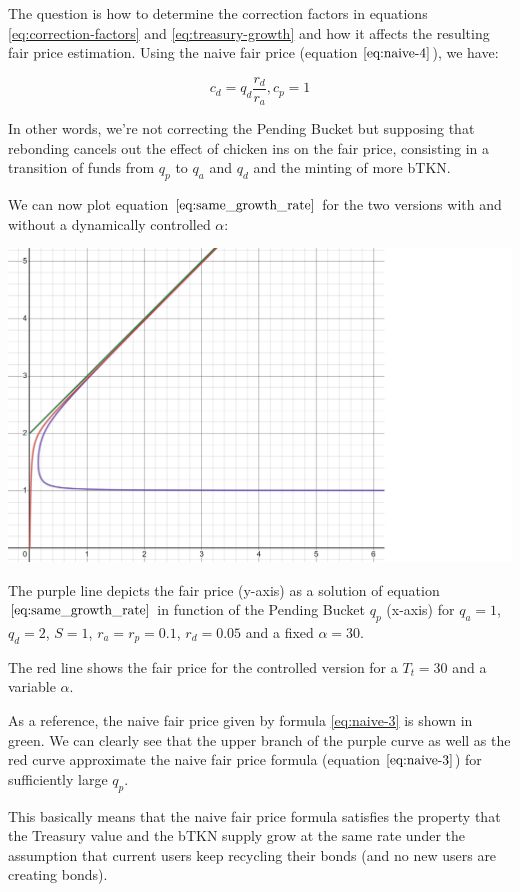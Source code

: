\documentclass{article}
\begin{document}
The question is how to determine the correction factors in equations \ref{eq:correction-factors} and \ref{eq:treasury-growth} and how it affects the resulting fair price estimation. Using the naive fair price (equation $\ref{eq:naive-4}$), we have:

\begin{equation}
  \label{}
   c_d=q_d \frac{r_d}{r_a}, c_p=1
\end{equation}

In other words, we're not correcting the Pending Bucket but supposing that rebonding cancels out the effect of chicken ins on the fair price, consisting in a transition of funds from $q_p$ to $q_a$ and $q_d$ and the minting of more bTKN.

We can now plot equation $\ref{eq:same_growth_rate}$ for the two versions with and without a dynamically controlled $\alpha$:

\includegraphics[width=\linewidth]{./ChickenBonds_Whitepaper_growth_price.png}

The purple line depicts the fair price (y-axis) as a solution of equation $\ref{eq:same_growth_rate}$ in function of the Pending Bucket $q_p$ (x-axis) for $q_a=1$, $q_d=2$, $S=1$, $r_a=r_p=0.1$, $r_d=0.05$ and a fixed $\alpha=30$. 

The red line shows the fair price for the controlled version for a $T_t=30$ and a variable $\alpha$.

As a reference, the naive fair price given by formula \ref{eq:naive-3} is shown in green. We can clearly see that the upper branch of the purple curve as well as the red curve approximate the naive fair price formula (equation $\ref{eq:naive-3}$) for sufficiently large $q_p$. 

This basically means that the naive fair price formula satisfies the property that the Treasury value and the bTKN supply grow at the same rate under the assumption that current users keep recycling their bonds (and no new users are creating bonds).
\end{document}
